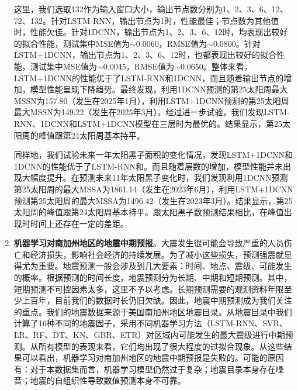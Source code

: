 \begin{enumerate}
    这里，我们选取132作为输入窗口大小，输出节点数分别为1、2、3、6、12、72、132。针对LSTM-RNN，输出节点为1时，性能最佳；节点数为其他值时，性能欠佳。针对1DCNN，输出节点为1、2、3、6、12时，均表现出较好的拟合性能，测试集中MSE值为$\sim$0.0060，RMSE值为$\sim$0.0800。针对LSTM+1DCNN，输出节点为1、2、3、6、12时，也都表现出较好的拟合性能，测试集中MSE值为$\sim$0.0045，RMSE值为$\sim$0.0650。整体来看，LSTM+1DCNN的性能优于了LSTM-RNN和1DCNN，而且随着输出节点的增加，模型性能呈现下降趋势。最终发现，利用1DCNN预测的第25太阳周最大MSSN为157.80（发生在2025年1月），利用LSTM+1DCNN预测的第25太阳周最大MSSN为149.22（发生在2025年3月）。经过进一步试验，我们发现LSTM-RNN、1DCNN和LSTM+1DCNN模型在三层时为最优的。结果显示，第25太阳周的峰值跟第24太阳周基本持平。
  
    同样地，我们试验未来一年太阳黑子面积的变化情况，发现LSTM+1DCNN和1DCNN的性能优于了LSTM-RNN和。而且随着层数的增加，模型性能并未出现大幅度提升。在预测未来11年太阳黑子变化时，我们发现利用1DCNN预测第25太阳周的最大MSSA为1861.14（发生在2023年6月），利用LSTM+1DCNN预测第25太阳周的最大MSSA为1496.42（发生在2023年3月）。结果显示，第25太阳周的峰值跟第24太阳周基本持平。跟太阳黑子数预测结果相比，在峰值出现时时间上还存在一定的差距。
    
    \item \textbf{机器学习对南加州地区的地震中期预报}。大震发生很可能会导致严重的人员伤亡和经济损失，影响社会经济的持续发展。为了减小这些损失，预测强震就显得尤为重要。地震预测一般会涉及到几大要素：时间、地点、震级、可能发生的概率。根据预测的时间长度，地震预测分为长期、中期和短期预测。其中，短期预测不可控因素太多，这里不予以考虑。长期预测需要的观测资料年限至少上百年，目前我们的数据时长仍旧欠缺。因此，地震中期预测成为我们关注的重点。我们的地震数据来源于美国南加州地区地震目录。从地震目录中我们计算了16种不同的地震因子，采用不同机器学习方法（LSTM-RNN、SVR、LR、RF、DT、KN、GBR、ETR）对区域内可能发生的最大震级进行中期预测。从所有模型的表现来看，它们均出现了很大程度的过拟合现象。从这些结果可以看出，机器学习对南加州地区的地震中期预报是失败的。可能的原因有：对于本数据集而言，机器学习模型仍然过于复杂；地震目录本身存在噪音；地震的自组织性导致数值预测本身不可靠。

\end{enumerate}